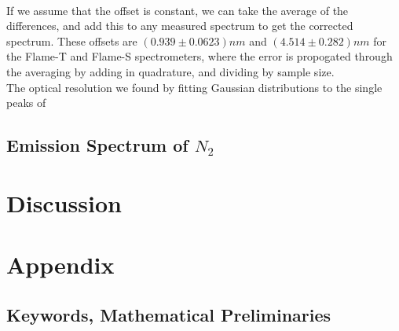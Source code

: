 \documentclass{article}
\begin{document}
\vspace{1cm}\\
If we assume that the offset is constant, we can take the average of the differences, and add this to any measured spectrum to get the corrected spectrum. These offsets are $(0.939\pm0.0623)nm$ and $(4.514\pm0.282) nm$ for the Flame-T and Flame-S spectrometers, where the error is propogated through the averaging by adding in quadrature, and dividing by sample size.\\
\indent The optical resolution we found by fitting Gaussian distributions to the single peaks of 

\subsection{Emission Spectrum of $N_2$}
\section{Discussion}
\newpage
\section{Appendix}

\subsection{Keywords, Mathematical Preliminaries}
\end{document}
